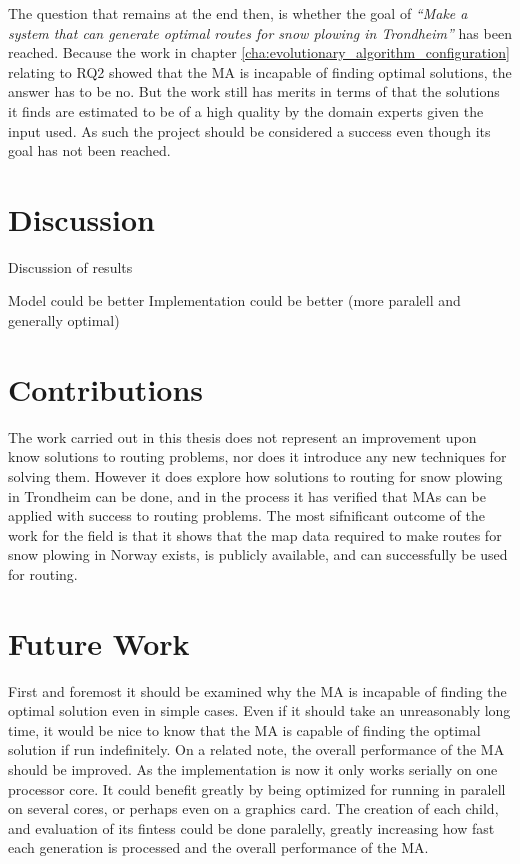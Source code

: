 The question that remains at the end then, is whether the goal of \emph{\enquote{Make a system that can generate optimal routes for snow plowing in Trondheim}} has been reached. Because the work in chapter \ref{cha:evolutionary_algorithm_configuration} relating to RQ2 showed that the MA is incapable of finding optimal solutions, the answer has to be no. But the work still has merits in terms of that the solutions it finds are estimated to be of a high quality by the domain experts given the input used. As such the project should be considered a success even though its goal has not been reached.

\section{Discussion}
Discussion of results

Model could be better
Implementation could be better (more paralell and generally optimal)



\section{Contributions}

The work carried out in this thesis does not represent an improvement upon know solutions to routing problems, nor does it introduce any new techniques for solving them. However it does explore how solutions to routing for snow plowing in Trondheim can be done, and in the process it has verified that MAs can be applied with success to routing problems. The most sifnificant outcome of the work for the field is that it shows that the map data required to make routes for snow plowing in Norway exists, is publicly available, and can successfully be used for routing.

\section{Future Work}

First and foremost it should be examined why the MA is incapable of finding the optimal solution even in simple cases. Even if it should take an unreasonably long time, it would be nice to know that the MA is capable of finding the optimal solution if run indefinitely. On a related note, the overall performance of the MA should be improved. As the implementation is now it only works serially on one processor core. It could benefit greatly by being optimized for running in paralell on several cores, or perhaps even on a graphics card. The creation of each child, and evaluation of its fintess could be done paralelly, greatly increasing how fast each generation is processed and the overall performance of the MA.


